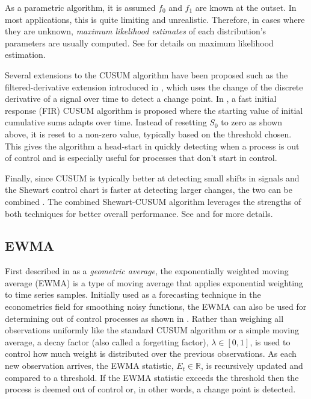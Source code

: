 As a parametric algorithm, it is assumed $f_0$ and $f_1$ are known at the outset. In most applications, this is quite limiting and unrealistic. Therefore, in cases where they are unknown, \textit{maximum likelihood estimates} of each distribution's parameters are usually computed. See \cite{kay1993fundamentals} for details on maximum likelihood estimation. 

Several extensions to the CUSUM algorithm have been proposed such as the filtered-derivative extension introduced in \cite{basseville1981edge}, which uses the change of the discrete derivative of a signal over time to detect a change point. In \cite{lucas1982fast}, a fast initial response (FIR) CUSUM algorithm is proposed where the starting value of initial cumulative sums adapts over time. Instead of resetting $S_0$ to zero as shown above, it is reset to a non-zero value, typically based on the threshold chosen. This gives the algorithm a head-start in quickly detecting when a process is out of control and is especially useful for processes that don't start in control.

Finally, since CUSUM is typically better at detecting small shifts in signals and the Shewart control chart is faster at detecting larger changes, the two can be combined \cite{lucas1982combined}. The combined Shewart-CUSUM algorithm leverages the strengths of both techniques for better overall performance. See  \cite{yashchin1985analysis} and \cite{westgard1977combined} for more details. 

\subsection{EWMA}
\label{ewma}
First described in \cite{roberts1959control} as a \textit{geometric average}, the exponentially weighted moving average (EWMA) is a type of moving average that applies exponential weighting to time series samples. Initially used as a forecasting technique in the econometrics field for smoothing noisy functions, the EWMA can also be used for determining out of control processes as shown in \cite{hunter1986exponentially}. Rather than weighing all observations uniformly like the standard CUSUM algorithm or a simple moving average, a decay factor (also called a  forgetting factor), $\lambda \in [0,1]$, is used to control how much weight is distributed over the previous observations. As each new observation arrives, the EWMA statistic, $E_t \in \mathbb{R}$, is recursively updated and compared to a threshold. If the EWMA statistic exceeds the threshold then the process is deemed out of control or, in other words, a change point is detected.

